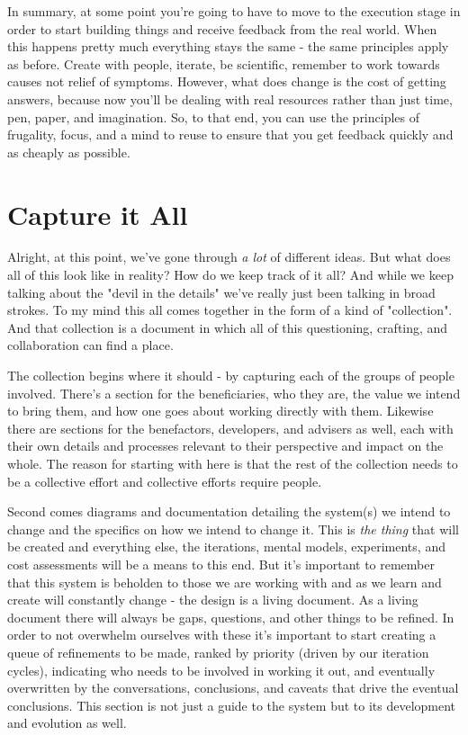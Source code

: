 \documentclass[11pt]{book}
\begin{document}
In summary, at some point you're going to have to move to the execution stage in order to start building things and receive feedback from the real world. When this happens pretty much everything stays the same - the same principles apply as before. Create with people, iterate, be scientific, remember to work towards causes not relief of symptoms. However, what does change is the cost of getting answers, because now you'll be dealing with real resources rather than just time, pen, paper, and imagination. So, to that end, you can use the principles of frugality, focus, and a mind to reuse to ensure that you get feedback quickly and as cheaply as possible. 

\section{Capture it All}
Alright, at this point, we've gone through \textit{a lot} of different ideas. But what does all of this look like in reality? How do we keep track of it all? And while we keep talking about the "devil in the details" we've really just been talking in broad strokes. To my mind this all comes together in the form of a kind of "collection". And that collection is a document in which all of this questioning, crafting, and collaboration can find a place.
\newline

The collection begins where it should - by capturing each of the groups of people involved. There's a section for the beneficiaries, who they are, the value we intend to bring them, and how one goes about working directly with them. Likewise there are sections for the benefactors, developers, and advisers as well, each with their own details and processes relevant to their perspective and impact on the whole. The reason for starting with here is that the rest of the collection needs to be a collective effort and collective efforts require people.
\newline

Second comes diagrams and documentation detailing the system(s) we intend to change and the specifics on how we intend to change it. This is \textit{the thing} that will be created and everything else, the iterations, mental models, experiments, and cost assessments will be a means to this end. But it's important to remember that this system is beholden to those we are working with and as we learn and create will constantly change - the design is a living document. As a living document there will always be gaps, questions, and other things to be refined. In order to not overwhelm ourselves with these it's important to start creating a queue of refinements to be made, ranked by priority (driven by our iteration cycles), indicating who needs to be involved in working it out, and eventually overwritten by the conversations, conclusions, and caveats that drive the eventual conclusions. This section is not just a guide to the system but to its development and evolution as well.
\newline
\end{document}
